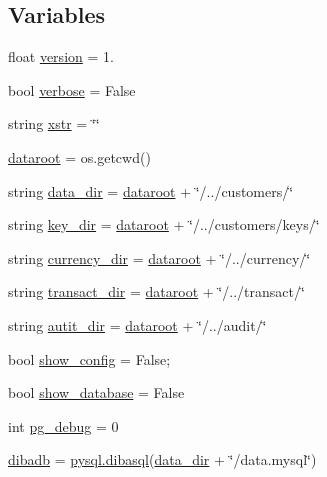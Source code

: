 \subsection*{Variables}
\begin{DoxyCompactItemize}
\item 
float \hyperlink{namespacedibagui_ab62c3e734e7e08da39abab83df1b3fd5}{version} = 1.
\item 
bool \hyperlink{namespacedibagui_ab3f078684998b83967d507d0f453f454}{verbose} = False
\item 
string \hyperlink{namespacedibagui_ac320f4c3d827e13121dcfcb8a7efa02e}{xstr} = \char`\"{}\char`\"{}
\item 
\hyperlink{namespacedibagui_a5cdafc01cb2d85e5af4a95537b9713de}{dataroot} = os.\+getcwd()
\item 
string \hyperlink{namespacedibagui_a5437a7caa57bba3f6e4d82d92bafd787}{data\+\_\+dir} = \hyperlink{namespacedibagui_a5cdafc01cb2d85e5af4a95537b9713de}{dataroot} + \char`\"{}/../customers/\char`\"{}
\item 
string \hyperlink{namespacedibagui_ad29c08ef121cb6e69df9433aa5b101d7}{key\+\_\+dir} = \hyperlink{namespacedibagui_a5cdafc01cb2d85e5af4a95537b9713de}{dataroot} + \char`\"{}/../customers/keys/\char`\"{}
\item 
string \hyperlink{namespacedibagui_a0182fb6d799f924051fc39db43ac050d}{currency\+\_\+dir} = \hyperlink{namespacedibagui_a5cdafc01cb2d85e5af4a95537b9713de}{dataroot} + \char`\"{}/../currency/\char`\"{}
\item 
string \hyperlink{namespacedibagui_acfd64cb0e90b8a7e009dfc0cdd61f41d}{transact\+\_\+dir} = \hyperlink{namespacedibagui_a5cdafc01cb2d85e5af4a95537b9713de}{dataroot} + \char`\"{}/../transact/\char`\"{}
\item 
string \hyperlink{namespacedibagui_a118b1aec766aad00e7a9b1af8ecee060}{autit\+\_\+dir} = \hyperlink{namespacedibagui_a5cdafc01cb2d85e5af4a95537b9713de}{dataroot} + \char`\"{}/../audit/\char`\"{}
\item 
bool \hyperlink{namespacedibagui_ade4505b1fe1f797b7ef71cbc47797527}{show\+\_\+config} = False;
\item 
bool \hyperlink{namespacedibagui_a0a0b222655f06efabe335006eb100963}{show\+\_\+database} = False
\item 
int \hyperlink{namespacedibagui_a600ddd05c2ac080c09850285e9707769}{pg\+\_\+debug} = 0
\item 
\hyperlink{namespacedibagui_aea382d5bc10635f82287dcc5486e4ed1}{dibadb} = \hyperlink{classpysql_1_1dibasql}{pysql.\+dibasql}(\hyperlink{namespacedibagui_a5437a7caa57bba3f6e4d82d92bafd787}{data\+\_\+dir} + \char`\"{}/data.\+mysql\char`\"{})

\end{DoxyCompactItemize}

